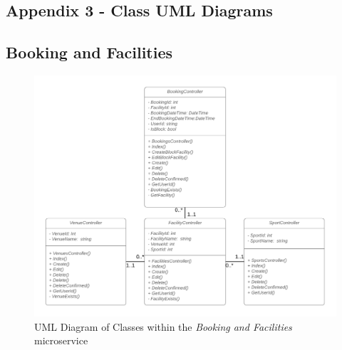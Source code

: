 \fancyhf{}
\renewcommand{\headrulewidth}{0pt}

\begin{landscape}


\section{Appendix 3 - Class UML Diagrams}
\label{Appendix_3}

\subsection{Booking and Facilities}
\begin{figure}[H]
    \centering
    \includegraphics[width=\textwidth]{Images/class_uml/booking_facilities.png}
    \caption{UML Diagram of Classes within the \textit{Booking and Facilities} microservice}
    \label{fig:class_uml:booking-facilities}
\end{figure}


\end{landscape}
